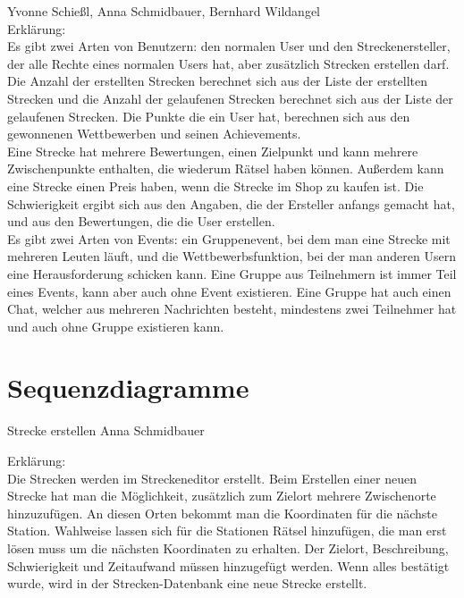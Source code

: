 \documentclass[a4paper, 12pp]{article}
\begin{document}
\begin{figure}[H] 
\centering
	\fbox{\begin{minipage}{16cm} 
	\end{minipage}}
\end{figure}
Yvonne Schießl, Anna Schmidbauer, Bernhard Wildangel\\
Erklärung:\\
Es gibt zwei Arten von Benutzern: den normalen User und den Streckenersteller, der alle Rechte eines normalen Users hat, aber zusätzlich Strecken erstellen darf. Die Anzahl der erstellten Strecken berechnet sich aus der Liste der erstellten Strecken und die Anzahl der gelaufenen Strecken berechnet sich aus der Liste der gelaufenen Strecken. Die Punkte die ein User hat, berechnen sich aus den gewonnenen Wettbewerben und seinen Achievements.\\
Eine Strecke hat mehrere Bewertungen, einen Zielpunkt und kann mehrere Zwischenpunkte enthalten, die wiederum Rätsel haben können. Außerdem kann eine Strecke einen Preis haben, wenn die Strecke im Shop zu kaufen ist. Die Schwierigkeit ergibt sich aus den Angaben, die der Ersteller anfangs gemacht hat, und aus den Bewertungen, die die User erstellen.\\
Es gibt zwei Arten von Events: ein Gruppenevent, bei dem man eine Strecke mit mehreren Leuten läuft, und die Wettbewerbsfunktion, bei der man anderen Usern eine Herausforderung schicken kann. Eine Gruppe aus Teilnehmern ist immer Teil eines Events, kann aber auch ohne Event existieren. Eine Gruppe hat auch einen Chat, welcher aus mehreren Nachrichten besteht, mindestens zwei Teilnehmer hat und auch ohne Gruppe existieren kann.\\


\section{Sequenzdiagramme}

{\Large Strecke erstellen}
Anna Schmidbauer
\begin{figure}[H] 
\centering
	\fbox{\begin{minipage}{16cm} 
	\end{minipage}}
\end{figure}

Erklärung:\\
Die Strecken werden im Streckeneditor erstellt. Beim Erstellen einer neuen Strecke hat man die Möglichkeit, zusätzlich zum Zielort mehrere Zwischenorte hinzuzufügen. An diesen Orten bekommt man die Koordinaten für die nächste Station. Wahlweise lassen sich für die Stationen Rätsel hinzufügen, die man erst lösen muss um die nächsten Koordinaten zu erhalten. Der Zielort, Beschreibung, Schwierigkeit und Zeitaufwand müssen hinzugefügt werden. Wenn alles bestätigt wurde, wird in der Strecken-Datenbank eine neue Strecke erstellt.\\
\end{document}
